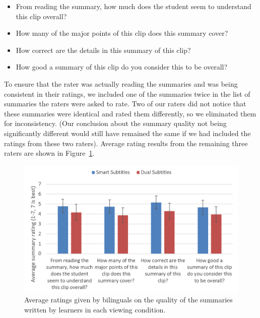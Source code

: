 \documentclass{sigchi}
\begin{document}
\begin{itemize}[noitemsep]
\item From reading the summary, how much does the student seem to understand this clip overall? %
\item How many of the major points of this clip does this summary cover? %
\item How correct are the details in this summary of this clip? %
\item How good a summary of this clip do you consider this to be overall? %
\end{itemize}

To ensure that the rater was actually reading the summaries and
was being consistent in their ratings,
we included one of the summaries twice in the list of summaries the
raters were asked to rate.
Two of our raters did not notice that these summaries were identical and
rated them differently, so we eliminated them for inconsistency.
(Our conclusion about the summary quality not being significantly different would still have remained the same if we had included the ratings from these two
raters).
Average rating results from the remaining three raters are shown in Figure~\ref{fig:figure9}.

\begin{figure}[!h]
\centering
\includegraphics[width=\columnwidth]{summary-ratings}
\caption{Average ratings given by bilinguals on the quality of the summaries written by learners in each viewing condition.}
\label{fig:figure9}
\end{figure}
\end{document}
